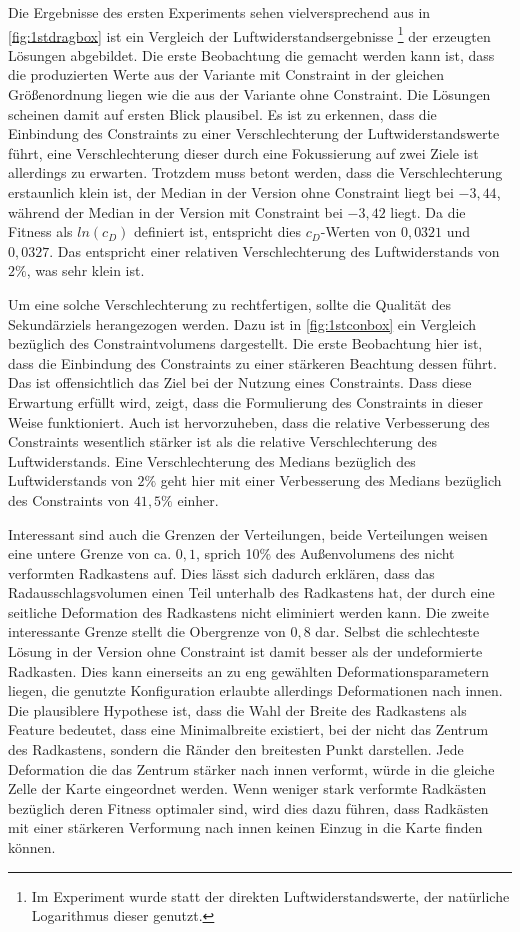 Die Ergebnisse des ersten Experiments sehen vielversprechend aus in  \cref{fig:1stdragbox} ist ein Vergleich der Luftwiderstandsergebnisse 
\footnote{Im Experiment wurde statt der direkten Luftwiderstandswerte, der natürliche Logarithmus dieser genutzt.} 
der erzeugten Lösungen abgebildet.
Die erste Beobachtung die gemacht werden kann ist, dass die produzierten Werte aus der Variante mit Constraint in der gleichen Größenordnung liegen wie die aus der Variante ohne Constraint.
Die Lösungen scheinen damit auf ersten Blick plausibel.
Es ist zu erkennen, dass die Einbindung des Constraints zu einer Verschlechterung der Luftwiderstandswerte führt, eine Verschlechterung dieser durch eine Fokussierung auf zwei Ziele ist allerdings zu erwarten.
Trotzdem muss betont werden, dass die Verschlechterung erstaunlich klein ist, der Median in der Version ohne Constraint liegt bei $-3,44$, während der Median in der Version mit Constraint bei $-3,42$ liegt.
Da die Fitness als $ln(c_D)$ definiert ist, entspricht dies $c_D$-Werten von $0,0321$ und $0,0327$.
Das entspricht einer relativen Verschlechterung des Luftwiderstands von $2\%$, was sehr klein ist.

Um eine solche Verschlechterung zu rechtfertigen, sollte die Qualität des Sekundärziels herangezogen werden.
Dazu ist in \cref{fig:1stconbox} ein Vergleich bezüglich des Constraintvolumens dargestellt.
Die erste Beobachtung hier ist, dass die Einbindung des Constraints zu einer stärkeren Beachtung dessen führt.
Das ist offensichtlich das Ziel bei der Nutzung eines Constraints. 
Dass diese Erwartung erfüllt wird, zeigt, dass die Formulierung des Constraints in dieser Weise funktioniert.
Auch ist hervorzuheben, dass die relative Verbesserung des Constraints wesentlich stärker ist als die relative Verschlechterung des Luftwiderstands.
Eine Verschlechterung des Medians bezüglich des Luftwiderstands von $2\%$ geht hier mit einer Verbesserung des Medians bezüglich des Constraints von $41,5\%$ einher.

Interessant sind auch die Grenzen der Verteilungen, beide Verteilungen weisen eine untere Grenze von ca. $0,1$, sprich 10\% des Außenvolumens des nicht verformten Radkastens auf.
Dies lässt sich dadurch erklären, dass das Radausschlagsvolumen einen Teil unterhalb des Radkastens hat, der durch eine seitliche Deformation des Radkastens nicht eliminiert werden kann.
Die zweite interessante Grenze stellt die Obergrenze von $0,8$ dar.
Selbst die schlechteste Lösung in der Version ohne Constraint ist damit besser als der undeformierte Radkasten.
Dies kann einerseits an zu eng gewählten Deformationsparametern liegen, die genutzte Konfiguration erlaubte allerdings Deformationen nach innen.
Die plausiblere Hypothese ist, dass die Wahl der Breite des Radkastens als Feature bedeutet, dass eine Minimalbreite existiert, bei der nicht das Zentrum des Radkastens, sondern die Ränder den breitesten Punkt darstellen.
Jede Deformation die das Zentrum stärker nach innen verformt, würde in die gleiche Zelle der Karte eingeordnet werden.
Wenn weniger stark verformte Radkästen bezüglich deren Fitness optimaler sind, wird dies dazu führen, dass Radkästen mit einer stärkeren Verformung nach innen keinen Einzug in die Karte finden können.

